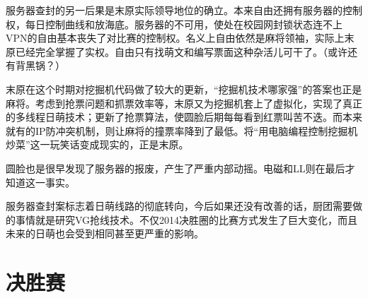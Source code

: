 服务器查封的另一后果是末原实际领导地位的确立。本来自由还拥有服务器的控制权，每日控制曲线和放海底。服务器的不可用，使处在校园网封锁状态连不上VPN的自由基本丧失了对比赛的控制权。名义上自由依然是麻将领袖，实际上末原已经完全掌握了实权。自由只有找萌文和编写票面这种杂活儿可干了。（或许还有背黑锅？）

末原在这个时期对挖掘机代码做了较大的更新，“挖掘机技术哪家强”的答案也正是麻将。考虑到抢票问题和抓票效率等，末原又为挖掘机套上了虚拟化，实现了真正的多线程日萌技术；更新了抢票算法，使圆脸后期每每看到红票叫苦不迭。而本来就有的IP防冲突机制，则让麻将的撞票率降到了最低。将“用电脑编程控制挖掘机炒菜”这一玩笑话变成现实的，正是末原。

圆脸也是很早发现了服务器的报废，产生了严重内部动摇。电磁和LL则在最后才知道这一事实。

服务器查封案标志着日萌线路的彻底转向，今后如果还没有改善的话，厨团需要做的事情就是研究VG抢线技术。不仅2014决胜圈的比赛方式发生了巨大变化，而且未来的日萌也会受到相同甚至更严重的影响。

\chapter{决胜赛}

